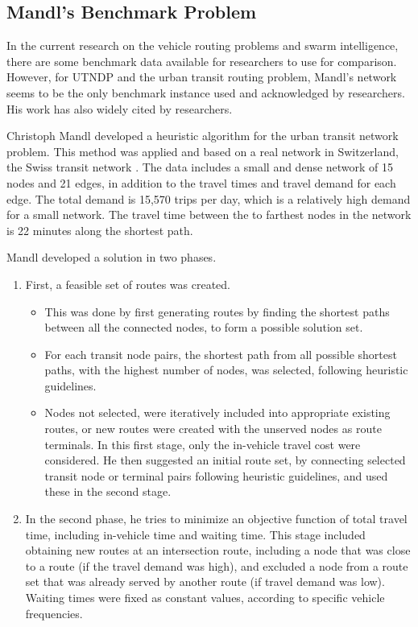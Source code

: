 \subsection{Mandl's Benchmark Problem}

In the current research on the vehicle routing problems and swarm intelligence, there are some benchmark data available for researchers to use for comparison. However, for UTNDP and the urban transit routing problem, Mandl's network seems to be the only benchmark instance used and acknowledged by researchers. His work has also widely cited by researchers. %

Christoph Mandl developed a heuristic algorithm for the urban transit network problem. This method was applied and based on a real network in Switzerland, the Swiss transit network \citep{mandl79} . The data includes a small and dense network of 15 nodes and 21 edges, in addition to the travel times and travel demand for each edge. The total demand is 15,570 trips per day, which is a relatively high demand for a small network. The travel time between the to farthest nodes in the network is 22 minutes along the shortest path. 

Mandl developed a solution in two phases. 

\begin{enumerate}
\item First, a feasible set of routes was created. 
\begin{itemize}
\item This was done by first generating routes by finding the shortest paths between all the connected nodes, to form a possible solution set. %
\item For each transit node pairs, the shortest path from all possible shortest paths, with the highest number of nodes, was selected, following heuristic guidelines. 
\item Nodes not selected, were iteratively included into appropriate existing routes, or new routes were created with the unserved nodes as route terminals. 
In this first stage, only the in-vehicle travel cost were considered. He then suggested an initial route set, by connecting selected transit node or terminal pairs following heuristic guidelines, and used these in the second stage. 
\end{itemize}
\item In the second phase, he tries to minimize an objective function of total travel time, including in-vehicle time and waiting time. This stage included obtaining new routes at an intersection route, including a node that was close to a route (if the travel demand was high), and excluded a node from a route set that was already served by another route (if travel demand was low). Waiting times were fixed as constant values, according to specific vehicle frequencies.  
\end{enumerate}

